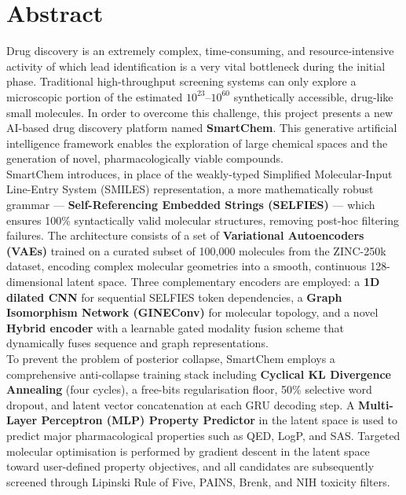 \documentclass[12pt,a4paper]{report}
\begin{document}
\chapter*{Abstract}

Drug discovery is an extremely complex, time-consuming, and resource-intensive activity of which lead identification is a very vital bottleneck during the initial phase. Traditional high-throughput screening systems can only explore a microscopic portion of the estimated $10^{23}$--$10^{60}$ synthetically accessible, drug-like small molecules. In order to overcome this challenge, this project presents a new AI-based drug discovery platform named \textbf{SmartChem}. This generative artificial intelligence framework enables the exploration of large chemical spaces and the generation of novel, pharmacologically viable compounds.
\\

SmartChem introduces, in place of the weakly-typed Simplified Molecular-Input Line-Entry System (SMILES) representation, a more mathematically robust grammar — \textbf{Self-Referencing Embedded Strings (SELFIES)} — which ensures 100\% syntactically valid molecular structures, removing post-hoc filtering failures. The architecture consists of a set of \textbf{Variational Autoencoders (VAEs)} trained on a curated subset of 100{,}000 molecules from the ZINC-250k dataset, encoding complex molecular geometries into a smooth, continuous 128-dimensional latent space. Three complementary encoders are employed: a \textbf{1D dilated CNN} for sequential SELFIES token dependencies, a \textbf{Graph Isomorphism Network (GINEConv)} for molecular topology, and a novel \textbf{Hybrid encoder} with a learnable gated modality fusion scheme that dynamically fuses sequence and graph representations.
\\

To prevent the problem of posterior collapse, SmartChem employs a comprehensive anti-collapse training stack including \textbf{Cyclical KL Divergence Annealing} (four cycles), a free-bits regularisation floor, 50\% selective word dropout, and latent vector concatenation at each GRU decoding step. A \textbf{Multi-Layer Perceptron (MLP) Property Predictor} in the latent space is used to predict major pharmacological properties such as QED, LogP, and SAS. Targeted molecular optimisation is performed by gradient descent in the latent space toward user-defined property objectives, and all candidates are subsequently screened through Lipinski Rule of Five, PAINS, Brenk, and NIH toxicity filters.
\\
\end{document}
